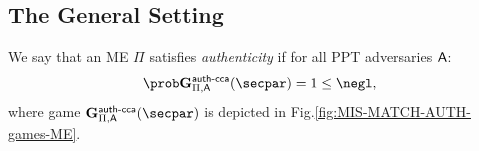 \subsection{The General Setting}
\begin{definition}[Authenticity of ME]\label{def:me_auth}
    We say that an ME $\Pi$ satisfies {\em authenticity} if for all PPT adversaries $\mathsf{A}$:
    \[
        \Prob{\NISHeufgamecca{}_{\Pi, \adversary}(\secpar) = 1} \leq \negl,
    \]
    where game $\NISHeufgamecca{}_{\Pi, \adversary}(\secpar)$ is depicted in Fig.\ref{fig:MIS-MATCH-AUTH-games-ME}.
\end{definition}